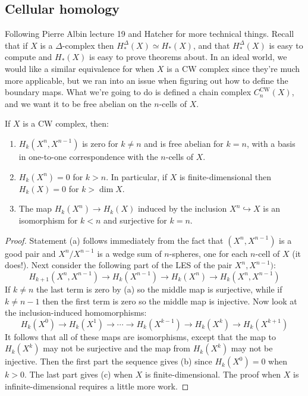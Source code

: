 \subsection{Cellular homology}
Following Pierre Albin lecture 19 and Hatcher for more technical things. Recall that if $X$ is a $\Delta $-complex then $H_*^{\Delta }(X)\simeq H_*(X)$, and that $H_*^{\Delta }(X)$ is easy to compute and $H_*(X)$ is easy to prove theorems about. In an ideal world, we would like a similar equivalence for when $X$ is a CW complex since they're much more applicable, but we ran into an issue when figuring out how to define the boundary maps. 
What we're going to do is defined a chain complex $C_n ^{\text{CW}}(X)$, and we want it to be free abelian on the $n$-cells of $X$.
\begin{lemma}\label{cells}
    If $X$ is a CW complex, then:
    \begin{enumerate}[label=(\alph*)]
        \item $H_k(X^n ,X^{n-1})$ is zero for $k\neq n$ and is free abelian for $k=n$, with a basis in one-to-one correspondence with the $n$-cells of $X$.
        \item $H_k(X^n )=0$ for $k>n$. In particular, if $X$ is finite-dimensional then $H_k(X)=0$ for $k>\operatorname{dim}X$.
        \item The map $H_k (X^n )\to H_k(X)$ induced by the inclusion $X^n \hookrightarrow X$ is an isomorphism for $k<n$ and surjective for $k=n$.
    \end{enumerate}
\end{lemma}
\begin{proof}
    Statement (a) follows immediately from the fact that $(X^n ,X^{n-1})$ is a good pair and $X^n  / X^{n-1}$ is a wedge sum of $n$-spheres, one for each $n$-cell of $X$ (it does!). Next consider the following part of the LES of the pair $X^n ,X^{n-1})$: \[
        H_{k+1}(X^n ,X^{n-1})\to H_k(X^{n-1})\to H_k(X^n )\to H_k(X^n ,X^{n-1})
    \] If $k\neq n$ the last term is zero by (a) so the middle map is surjective, while if $k\neq n-1$ then the first term is zero so the middle map is injective. Now look at the inclusion-induced homomorphisms: \[
    H_k(X^0) \to H_k(X^1) \to \cdots \to H_k(X^{k-1}) \to H_k(X^k) \to H_k(X^{k+1})
\] It follows that all of these maps are isomorphisms, except that the map to $H_k(X^k)$ may not be surjective and the map from $H_k(X^k)$ may not be injective. Then the first part the sequence gives (b) since $H_k(X^0)=0$ when $k>0$. The last part gives (c) when $X$ is finite-dimensional. The proof when $X$ is infinite-dimensional requires a little more work.
\end{proof}
